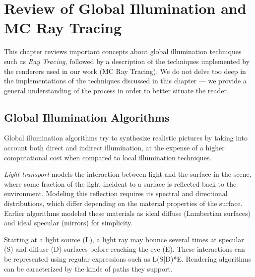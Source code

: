 \chapter{Review of Global Illumination and MC Ray Tracing}
\label{sec:theory}

This chapter reviews important concepts about  global illumination techniques such as \textit{Ray Tracing}, followed by 
a description of 
the techniques implemented by the renderers used in our work (MC Ray Tracing). We do not delve too deep in the implementations of the techniques discussed in this chapter --- we provide a general understanding of the process in order to better situate the reader.

\section{Global Illumination Algorithms}

Global illumination algorithms try to synthesize realistic pictures by
taking into account both direct and indirect illumination, at the expense of a higher computational cost when compared to local illumination techniques. 

{\it Light transport} models the interaction between light and the surface in the scene, 
where some fraction of the light incident to a surface is reflected back to the environment. Modeling this reflection requires its spectral and directional distributions, which differ depending on the material properties of the surface. Earlier algorithms modeled these materials as ideal diffuse (Lambertian surfaces) and ideal specular (mirrors) for simplicity.

Starting at a light source (L), a light ray may bounce several times at specular (S) and diffuse (D) surfaces before reaching the eye (E). These interactions can be represented using regular expressions such as L(S|D)*E. Rendering algorithms can be caracterized by the kinds of paths they support.

